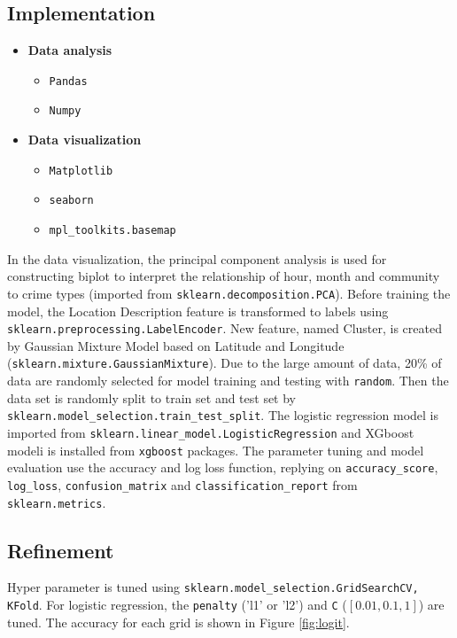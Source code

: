 \documentclass[12pt]{article}
\begin{document}
\subsection{Implementation}
\begin{itemize}
\item{\bf Data analysis} 
	\begin{itemize}
	\item \verb|Pandas|
	\item \verb|Numpy|
	\end{itemize}
\item{\bf Data visualization} 
	\begin{itemize}
	\item \verb|Matplotlib|
	\item \verb|seaborn|
	\item \verb|mpl_toolkits.basemap|
	\end{itemize}
\end{itemize}

In the data visualization, the principal component analysis is used for constructing biplot to interpret the relationship of hour, month and community to crime types (imported from \verb|sklearn.decomposition.PCA|). Before training the model, the Location Description feature is transformed to labels using \verb|sklearn.preprocessing.LabelEncoder|. New feature, named Cluster, is created by Gaussian Mixture Model based on Latitude and Longitude (\verb|sklearn.mixture.GaussianMixture|). Due to the large amount of data, 20\% of data are randomly selected for model training and testing with \verb|random|. Then the data set is randomly split to train set and test set by \verb|sklearn.model_selection.train_test_split|. The logistic regression model is imported from \verb|sklearn.linear_model.LogisticRegression| and XGboost modeli is installed from \verb|xgboost| packages. The parameter tuning and model evaluation use the accuracy and log loss function, replying on \verb|accuracy_score|, \verb|log_loss|, \verb|confusion_matrix| and \verb|classification_report| from \verb|sklearn.metrics|.



\subsection{Refinement}
Hyper parameter is tuned using \verb|sklearn.model_selection.GridSearchCV, KFold|.
For logistic regression, the \verb|penalty| ('l1' or 'l2') and \verb|C| ($[0.01, 0.1, 1]$) are tuned. The accuracy for each grid is shown in Figure \ref{fig:logit}.
\end{document}
